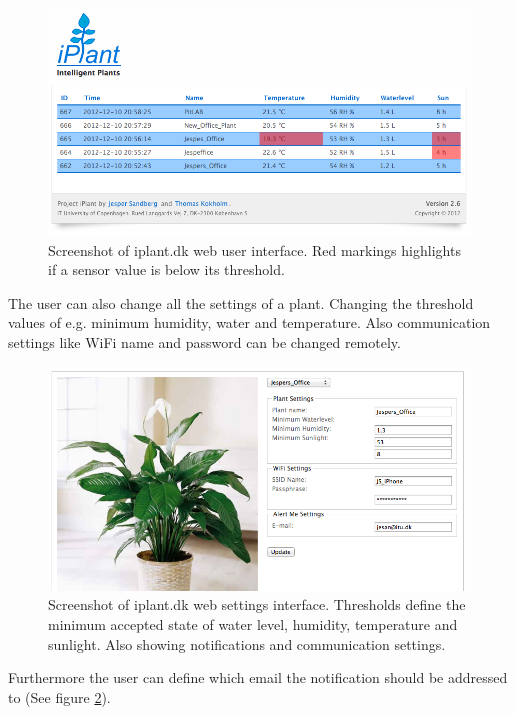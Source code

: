 \documentclass{ubicomp2012}
\begin{document}
\begin{figure}[h!]
\centering
\includegraphics[width=\columnwidth]{web_overview.png}
\caption{Screenshot of iplant.dk web user interface. Red markings highlights if a sensor value is below its threshold.}
\label{fig:web_overview}
\end{figure}

The user can also change all the settings of a plant. Changing the threshold values of e.g. minimum humidity, water and temperature. Also communication settings like WiFi name and password can be changed remotely.

\begin{figure}[h!]
\centering
\includegraphics[width=\columnwidth]{web_settings.png}
\caption{Screenshot of iplant.dk web settings interface. Thresholds define the minimum accepted state of water level, humidity, temperature and sunlight. Also showing notifications and communication settings.}
\label{fig:web_settings}
\end{figure}

Furthermore the user can define which email the notification should be addressed to (See figure \ref{fig:web_settings}).
\end{document}

